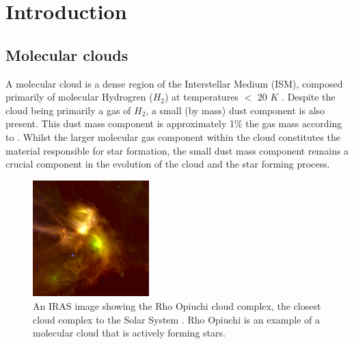 \documentclass{report}
\begin{document}
\listoftables


\chapter{Introduction}

\section{Molecular clouds}
A molecular cloud is a dense region of the Interstellar Medium (ISM), composed primarily of molecular Hydrogren ($H_{2}$) at temperatures $<$ 20 $K$ \parencite{dustopacity}. Despite the cloud being primarily a gas of $H_{2}$, a small (by mass) dust component is also present. This dust mass component is approximately 1\% the gas mass according to \textcite{noise}. Whilst the larger molecular gas component within the cloud constitutes the material responsible for star formation, the small dust mass component remains a crucial component in the evolution of the cloud and the star forming process.

\begin{figure}
  \begin{center}
    \includegraphics[width=0.4\textwidth]{../img/rho.jpg}
    \caption[An IRAS image showing the Rho Opiuchi cloud complex, the closest cloud complex to the Solar System \parencite{rho}. Rho Opiuchi is an example of a molecular cloud that is actively forming stars.]{An IRAS image showing the Rho Opiuchi cloud complex, the closest cloud complex to the Solar System \parencite{rho}. Rho Opiuchi is an example of a molecular cloud that is actively forming stars.}
  \end{center}
\end{figure} \label{fig:rho}
\end{document}
